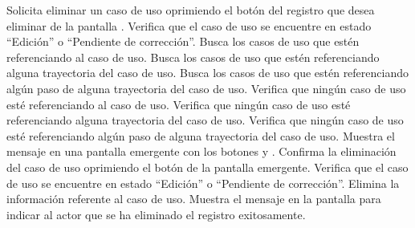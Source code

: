  \begin{UCtrayectoria}
    \UCpaso[\UCactor] Solicita eliminar un caso de uso oprimiendo el botón \btnEliminar del registro que desea eliminar de la pantalla .
    \UCpaso[\UCsist] Verifica que el caso de uso se encuentre en estado ``Edición'' o ``Pendiente de corrección''. 
    \UCpaso[\UCsist] Busca los casos de uso que estén referenciando al caso de uso.
    \UCpaso[\UCsist] Busca los casos de uso que estén referenciando alguna trayectoria del caso de uso.
    \UCpaso[\UCsist] Busca los casos de uso que estén referenciando algún paso de alguna trayectoria del caso de uso.
    \UCpaso[\UCsist] Verifica que ningún caso de uso esté referenciando al caso de uso. 
    \UCpaso[\UCsist] Verifica que ningún caso de uso esté referenciando alguna trayectoria del caso de uso. 
    \UCpaso[\UCsist] Verifica que ningún caso de uso esté referenciando algún paso de alguna trayectoria del caso de uso. 
    \UCpaso[\UCsist] Muestra el mensaje  en una pantalla emergente con los botones  y .
    \UCpaso[\UCactor] Confirma la eliminación del caso de uso oprimiendo el botón  de la pantalla emergente. 
    \UCpaso[\UCsist] Verifica que el caso de uso se encuentre en estado ``Edición'' o ``Pendiente de corrección''. 
    \UCpaso[\UCsist] Elimina la información referente al caso de uso.
    \UCpaso[\UCsist] Muestra el mensaje  en la pantalla 
    para indicar al actor que se ha eliminado el registro exitosamente.
 \end{UCtrayectoria}
 
